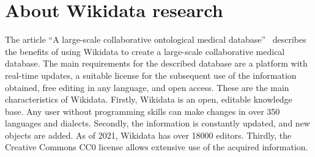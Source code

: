 \section{About Wikidata research}
The article ``A large-scale collaborative ontological medical database''~ describes the benefits of using Wikidata to create a large-scale collaborative medical database. The main requirements for the described database are a platform with real-time updates, a suitable license for the subsequent use of the information obtained, free editing in any language, and open access. These are the main characteristics of Wikidata. Firstly, Wikidata is an open, editable knowledge base. Any user without programming skills can make changes in over 350 languages and dialects. Secondly, the information is constantly updated, and new objects are added. As of 2021, Wikidata has over \num{18000} editors. Thirdly, the Creative Commons CC0 license allows extensive use of the acquired information.


